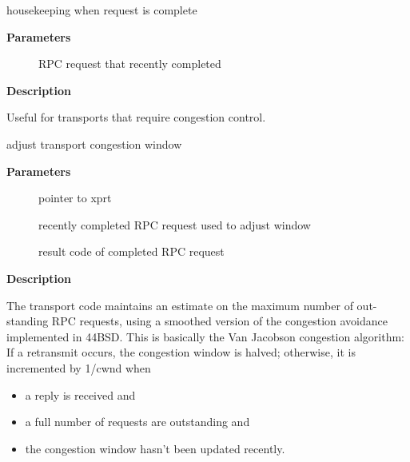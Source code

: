 \documentclass[a4paper,8pt,english]{sphinxmanual}
\begin{document}
\begin{fulllineitems}
\label{networking/kapi:c.xprt_release_rqst_cong}
housekeeping when request is complete

\end{fulllineitems}


\textbf{Parameters}
\begin{description}
\item[{}] \leavevmode
RPC request that recently completed

\end{description}

\textbf{Description}

Useful for transports that require congestion control.

\begin{fulllineitems}
\label{networking/kapi:c.xprt_adjust_cwnd}
adjust transport congestion window

\end{fulllineitems}


\textbf{Parameters}
\begin{description}
\item[{}] \leavevmode
pointer to xprt

\item[{}] \leavevmode
recently completed RPC request used to adjust window

\item[{}] \leavevmode
result code of completed RPC request

\end{description}

\textbf{Description}

The transport code maintains an estimate on the maximum number of out-
standing RPC requests, using a smoothed version of the congestion
avoidance implemented in 44BSD. This is basically the Van Jacobson
congestion algorithm: If a retransmit occurs, the congestion window is
halved; otherwise, it is incremented by 1/cwnd when
\begin{itemize}
\item {} 
a reply is received and

\item {} 
a full number of requests are outstanding and

\item {} 
the congestion window hasn't been updated recently.

\end{itemize}
\end{document}
